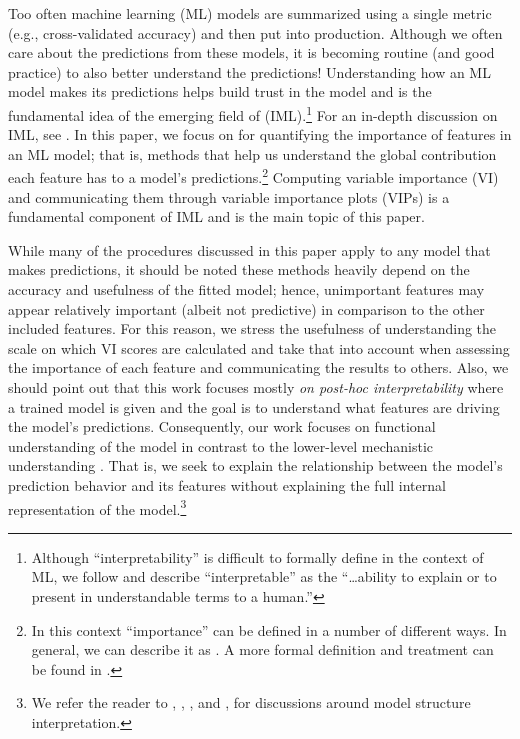 Too often machine learning (ML) models are summarized using a single
metric (e.g., cross-validated accuracy) and then put into production.
Although we often care about the predictions from these models, it is
becoming routine (and good practice) to also better understand the
predictions! Understanding how an ML model makes its predictions helps
build trust in the model and is the fundamental idea of the emerging
field of  (IML).\footnote{Although
  ``interpretability'' is difficult to formally define in the context of
  ML, we follow \citet{doshivelez-2017-rigorous} and describe
  ``interpretable'' as the ``\ldots{}ability to explain or to present in
  understandable terms to a human.''} For an in-depth discussion on IML,
see \citet{molnar-2019-iml}. In this paper, we focus on
 for quantifying the importance of features in an ML
model; that is, methods that help us understand the global contribution
each feature has to a model's predictions.\footnote{In this context
  ``importance'' can be defined in a number of different ways. In
  general, we can describe it as
  .
  A more formal definition and treatment can be found in
  \citet{laan-2006-statistical}.} Computing variable importance (VI) and
communicating them through variable importance plots (VIPs) is a
fundamental component of IML and is the main topic of this paper.

While many of the procedures discussed in this paper apply to any model
that makes predictions, it should be noted these methods heavily depend
on the accuracy and usefulness of the fitted model; hence, unimportant
features may appear relatively important (albeit not predictive) in
comparison to the other included features. For this reason, we stress
the usefulness of understanding the scale on which VI scores are
calculated and take that into account when assessing the importance of
each feature and communicating the results to others. Also, we should
point out that this work focuses mostly \emph{on post-hoc
interpretability} where a trained model is given and the goal is to
understand what features are driving the model's predictions.
Consequently, our work focuses on functional understanding of the model
in contrast to the lower-level mechanistic understanding
\citep{montavon-2018-methods}. That is, we seek to explain the
relationship between the model's prediction behavior and its features
without explaining the full internal representation of the
model.\footnote{We refer the reader to \citet{poulin-2006-visual},
  \citet{caruana-2015-intelligible},
  \citet{bibal-2016-intterpretability}, and \citet{bau-2017-network},
  for discussions around model structure interpretation.}

